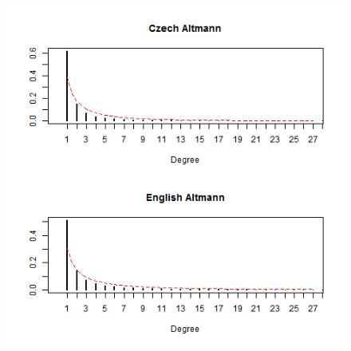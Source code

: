 \documentclass[paper=a4, fontsize=11pt]{scrartcl} %
\theoremstyle{plain}
\begin{document}
\begin{figure}[htbp] %
   \centering
   \includegraphics[width=15cm,height=27cm]{Altman_3} %
\end{figure}
\end{document}
